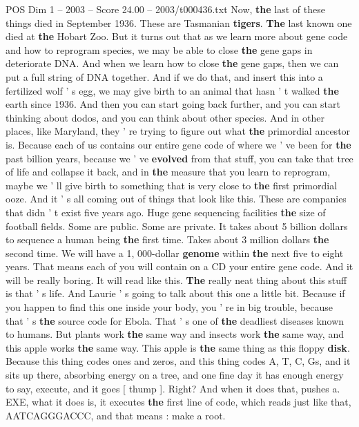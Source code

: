 \begin{textsample}{POS Dim 1 – 2003 – Score 24.00 – 2003/t000436.txt}
Now, \textbf{the} last of these things died in September 1936.
These are Tasmanian \textbf{tigers}. \textbf{The} last known one died at \textbf{the} Hobart Zoo.
But it turns out that as we learn more about gene code and how to reprogram species, we may be able to close \textbf{the} gene gaps in deteriorate DNA.
And when we learn how to close \textbf{the} gene gaps, then we can put a full string of DNA together.
And if we do that, and insert this into a fertilized wolf ' s egg, we may give birth to an animal that hasn ' t walked \textbf{the} earth since 1936.
And then you can start going back further, and you can start thinking about dodos, and you can think about other species.
And in other places, like Maryland, they ' re trying to figure out what \textbf{the} primordial ancestor is.
Because each of us contains our entire gene code of where we ' ve been for \textbf{the} past billion years, because we ' ve \textbf{evolved} from that stuff, you can take that tree of life and collapse it back, and in \textbf{the} measure that you learn to reprogram, maybe we ' ll give birth to something that is very close to \textbf{the} first primordial ooze.
And it ' s all coming out of things that look like this.
These are companies that didn ' t exist five years ago.
Huge gene sequencing facilities \textbf{the} size of football fields.
Some are public.
Some are private.
It takes about 5 billion dollars to sequence a human being \textbf{the} first time.
Takes about 3 million dollars \textbf{the} second time.
We will have a 1, 000-dollar \textbf{genome} within \textbf{the} next five to eight years.
That means each of you will contain on a CD your entire gene code.
And it will be really boring.
It will read like this. \textbf{The} really neat thing about this stuff is that ' s life.
And Laurie ' s going to talk about this one a little bit.
Because if you happen to find this one inside your body, you ' re in big trouble, because that ' s \textbf{the} source code for Ebola.
That ' s one of \textbf{the} deadliest diseases known to humans.
But plants work \textbf{the} same way and insects work \textbf{the} same way, and this apple works \textbf{the} same way.
This apple is \textbf{the} same thing as this floppy \textbf{disk}.
Because this thing codes ones and zeros, and this thing codes A, T, C, Gs, and it sits up there, absorbing energy on a tree, and one fine day it has enough energy to say, execute, and it goes [ thump ].
Right?
And when it does that, pushes a.
EXE, what it does is, it executes \textbf{the} first line of code, which reads just like that, AATCAGGGACCC, and that means : make a root.

\end{textsample}
